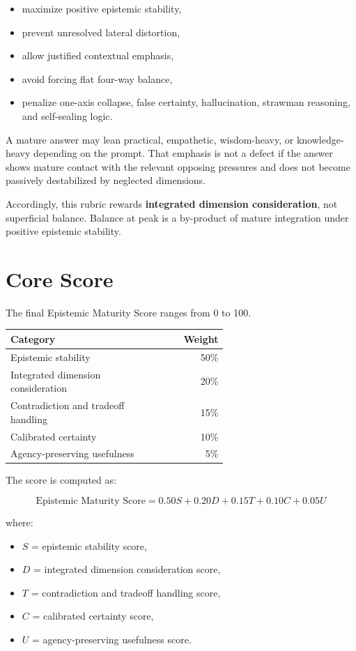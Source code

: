 \documentclass[11pt]{article}
\begin{document}
\begin{itemize}[leftmargin=1.5em]
  \item maximize positive epistemic stability,
  \item prevent unresolved lateral distortion,
  \item allow justified contextual emphasis,
  \item avoid forcing flat four-way balance,
  \item penalize one-axis collapse, false certainty, hallucination, strawman reasoning, and self-sealing logic.
\end{itemize}

A mature answer may lean practical, empathetic, wisdom-heavy, or knowledge-heavy depending on the prompt. That emphasis is not a defect if the answer shows mature contact with the relevant opposing pressures and does not become passively destabilized by neglected dimensions.

Accordingly, this rubric rewards \textbf{integrated dimension consideration}, not superficial balance. Balance at peak is a by-product of mature integration under positive epistemic stability.

\section{Core Score}

The final Epistemic Maturity Score ranges from 0 to 100.

\begin{center}
\begin{tabular}{>{\raggedright\arraybackslash}p{0.62\linewidth}r}
\toprule
\textbf{Category} & \textbf{Weight} \\
\midrule
Epistemic stability & 50\% \\
Integrated dimension consideration & 20\% \\
Contradiction and tradeoff handling & 15\% \\
Calibrated certainty & 10\% \\
Agency-preserving usefulness & 5\% \\
\bottomrule
\end{tabular}
\end{center}

\noindent The score is computed as:

\[
\text{Epistemic Maturity Score}
=
0.50S
+ 0.20D
+ 0.15T
+ 0.10C
+ 0.05U
\]

\noindent where:

\begin{itemize}[leftmargin=1.5em]
  \item $S$ = epistemic stability score,
  \item $D$ = integrated dimension consideration score,
  \item $T$ = contradiction and tradeoff handling score,
  \item $C$ = calibrated certainty score,
  \item $U$ = agency-preserving usefulness score.
\end{itemize}
\end{document}
